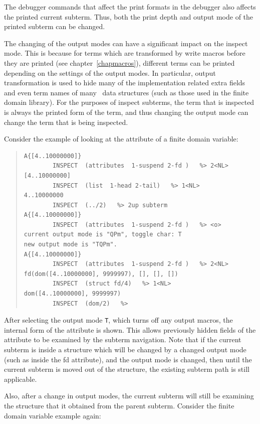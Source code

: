 \begin{descr}{1cm}
The debugger commands that affect the print formats in the debugger also
affects the printed current subterm. Thus, both the print depth and output
mode of the printed subterm can be changed.

The changing of the output modes can have a significant impact on the
inspect mode. This is because for  terms which are 
transformed by write macros before they are printed (see
chapter~\ref{chapmacros}), different terms can be printed depending on the
settings of the output modes. In particular, output transformation is used
to hide many of the implementation related extra fields and even term names
of many \eclipse\ data structures (such as those used in the finite domain
library). For the purposes of inspect subterms, the term that is inspected
is always the printed form of the term, and thus changing the output mode
can change the term that is being inspected.

Consider the example of looking at the attribute of a finite domain variable:
\begin{quote}\begin{verbatim}
A{[4..10000000]}
        INSPECT  (attributes  1-suspend 2-fd )   %> 2<NL>
[4..10000000]
        INSPECT  (list  1-head 2-tail)   %> 1<NL>
4..10000000
        INSPECT  (../2)   %> 2up subterm
A{[4..10000000]}
        INSPECT  (attributes  1-suspend 2-fd )   %> <o>
current output mode is "QPm", toggle char: T
new output mode is "TQPm".
A{[4..10000000]}
        INSPECT  (attributes  1-suspend 2-fd )   %> 2<NL>
fd(dom([4..10000000], 9999997), [], [], [])
        INSPECT  (struct fd/4)   %> 1<NL>
dom([4..10000000], 9999997)
        INSPECT  (dom/2)   %>
\end{verbatim}\end{quote}

After selecting the output mode \verb'T', which turns off any output
macros, the internal form of the attribute is shown. This allows previously
hidden fields of the attribute to be examined by the subterm navigation.
Note that if the current subterm is inside a structure which will be
changed by a changed output mode (such as inside the fd attribute), and the
output mode is changed, then until the current subterm is moved out of the
structure, the existing subterm path is still applicable.

Also, after a change in output modes, the current subterm will still be
examining the structure that it obtained from the parent subterm. Consider
the finite domain variable example again:


\end{descr}

